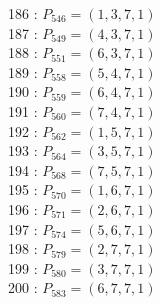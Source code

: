 \documentclass{article}
\begin{document}
{\begin{multicols}{3}
186 : $P_{546}=( 1, 3, 7, 1 )$\\
187 : $P_{549}=( 4, 3, 7, 1 )$\\
188 : $P_{551}=( 6, 3, 7, 1 )$\\
189 : $P_{558}=( 5, 4, 7, 1 )$\\
190 : $P_{559}=( 6, 4, 7, 1 )$\\
191 : $P_{560}=( 7, 4, 7, 1 )$\\
192 : $P_{562}=( 1, 5, 7, 1 )$\\
193 : $P_{564}=( 3, 5, 7, 1 )$\\
194 : $P_{568}=( 7, 5, 7, 1 )$\\
195 : $P_{570}=( 1, 6, 7, 1 )$\\
196 : $P_{571}=( 2, 6, 7, 1 )$\\
197 : $P_{574}=( 5, 6, 7, 1 )$\\
198 : $P_{579}=( 2, 7, 7, 1 )$\\
199 : $P_{580}=( 3, 7, 7, 1 )$\\
200 : $P_{583}=( 6, 7, 7, 1 )$\\
\end{multicols}


%


%


}%
\end{document}
